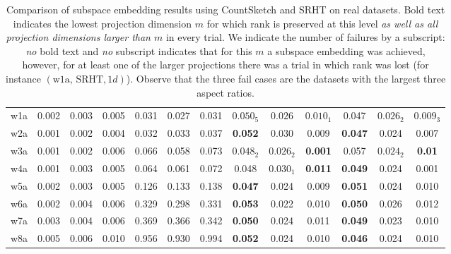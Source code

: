 \begin{table}[ht]
\begin{adjustbox}{width=1\textwidth}
\begin{tabular}{|c|c|c|c|c|c|c||c|c|c|c|c|c|}
\hline

w1a & 0.002 & 0.003 & 0.005 & 0.031 & 0.027 & 0.031 & $0.050_5$ & $0.026$ & $0.010_1$ & 0.047 & $0.026_2$ & $0.009_3$ \\

w2a & 0.001 & 0.002 & 0.004 & 0.032 & 0.033 & 0.037 & \textbf{0.052} & 0.030 & 0.009 & \textbf{0.047} & 0.024 & 0.007 \\

w3a & 0.001 & 0.002 & 0.006 & 0.066 & 0.058 & 0.073 & $0.048_2$ & $0.026_2$ & \textbf{0.001} & 0.057 & $0.024_2$ & \textbf{0.01} \\

w4a & 0.001 & 0.003 & 0.005 & 0.064 & 0.061 & 0.072 & 0.048 & $0.030_1$ & \textbf{0.011} & \textbf{0.049} & 0.024 & 0.001 \\

w5a & 0.002 & 0.003 & 0.005 & 0.126 & 0.133 & 0.138 & \textbf{0.047} & 0.024 & 0.009 & \textbf{0.051} & 0.024 & 0.010 \\

w6a & 0.002 & 0.004 & 0.006 & 0.329 & 0.298 & 0.331 & \textbf{0.053} & 0.022 & 0.010 & \textbf{0.050} &  0.026 & 0.012 \\

w7a & 0.003 & 0.004 & 0.006 & 0.369 & 0.366 & 0.342 & \textbf{0.050} & 0.024 & 0.011 & \textbf{0.049} & 0.023 & 0.010 \\

w8a & 0.005 & 0.006 & 0.010 & 0.956 & 0.930 & 0.994 & \textbf{0.052} & 0.024 & 0.010 & \textbf{0.046} & 0.024 & 0.010 \\
\hline
\end{tabular}
\end{adjustbox}
\caption{Comparison of subspace embedding results using CountSketch and SRHT
on real datasets.
Bold text indicates
the lowest projection dimension $m$ for which rank is preserved at this level
\textit{as well as all projection dimensions larger than $m$} in every trial.
We indicate the number of failures by a subscript: \textit{no} bold text and
\textit{no} subscript indicates that for this $m$ a subspace embedding was
achieved, however, for at least one of the larger projections there was a trial
in which rank was lost (for instance $(\text{w1a, SRHT}, 1d)$).
Observe that the three fail cases are the datasets  with the largest three
aspect ratios.}
\label{table: real-data-subspace-embedding}
\end{table}


